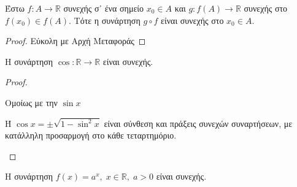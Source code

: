 \begin{prop}
  Έστω $ f \colon A \to \mathbb{R} $ συνεχής σ᾽ ένα σημείο $ x_{0} \in A $ 
  και $ g \colon f(A) \to \mathbb{R} $ συνεχής στο $ f(x_{0}) \in f(A) $. 
  Τότε η συνάρτηση $ g \circ f $ είναι συνεχής στο $ x_{0} \in A $.
\end{prop}

\begin{proof}
  Εύκολη με Αρχή Μεταφοράς
\end{proof}

\begin{prop}
  Η συνάρτηση $ \cos{} \colon \mathbb{R} \to \mathbb{R} $ είναι συνεχής.
\end{prop}

\begin{proof}
\item {}
  \begin{myitemize}
    \item Ομοίως με την $ \sin{x} $
    \item Ή $ \cos{x} = \pm \sqrt{1- \sin^{2}{x}} $ είναι σύνθεση και 
      πράξεις συνεχών συναρτήσεων, με κατάλληλη προσαρμογή στο 
      κάθε τεταρτημόριο.
  \end{myitemize}
\end{proof}

\begin{prop}
  Η συνάρτηση $ f(x) = a^{x}, \; x \in \mathbb{R}, \; a>0 $ είναι συνεχής.
\end{prop}

